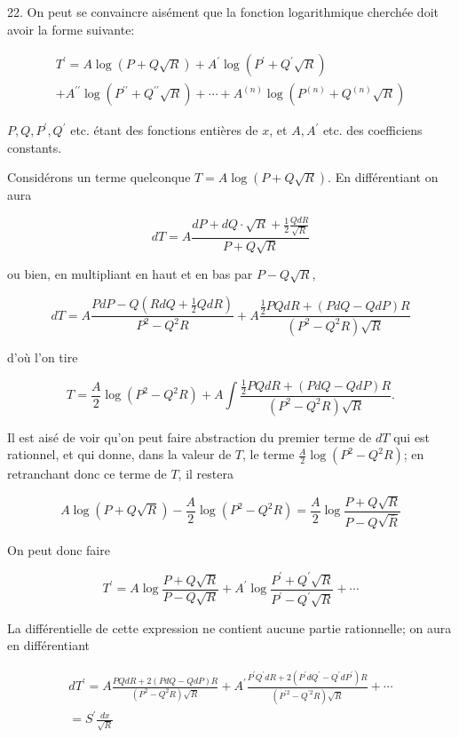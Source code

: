 \documentclass{article}
\begin{document}
22. On peut se convaincre aisément que la fonction logarithmique cherchée doit avoir la forme suivante:

\[
\begin{gathered}
T^{\prime}=A \log (P+Q \sqrt{R})+A^{\prime} \log \left(P^{\prime}+Q^{\prime} \sqrt{R}\right) \\
+A^{\prime \prime} \log \left(P^{\prime \prime}+Q^{\prime \prime} \sqrt{R}\right)+\cdots+A^{(n)} \log \left(P^{(n)}+Q^{(n)} \sqrt{R}\right)
\end{gathered}
\]

\(P, Q, P^{\prime}, Q^{\prime}\) etc. étant des fonctions entières de \(x\), et \(A, A^{\prime}\) etc. des coefficiens constants.

Considérons un terme quelconque \(T=A \log (P+Q \sqrt{R})\). En différentiant on aura

\[
d T=A \frac{d P+d Q \cdot \sqrt{R}+\frac{1}{2} \frac{Q d R}{\sqrt{R}}}{P+Q \sqrt{R}}
\]

ou bien, en multipliant en haut et en bas par \(P-Q \sqrt{R}\),

\[
d T=A \frac{P d P-Q\left(R d Q+\frac{1}{2} Q d R\right)}{P^{2}-Q^{2} R}+A \frac{\frac{1}{2} P Q d R+(P d Q-Q d P) R}{\left(P^{2}-Q^{2} R\right) \sqrt{R}}
\]

d'où l'on tire

\[
T=\frac{A}{2} \log \left(P^{2}-Q^{2} R\right)+A \int \frac{\frac{1}{2} P Q d R+(P d Q-Q d P) R}{\left(P^{2}-Q^{2} R\right) \sqrt{R}} .
\]

Il est aisé de voir qu'on peut faire abstraction du premier terme de \(d T\) qui est rationnel, et qui donne, dans la valeur de \(T\), le terme \(\frac{A}{2} \log \left(P^{2}-Q^{2} R\right)\); en retranchant donc ce terme de \(T\), il restera

\[
A \log (P+Q \sqrt{R})-\frac{A}{2} \log \left(P^{2}-Q^{2} R\right)=\frac{A}{2} \log \frac{P+Q \sqrt{R}}{P-Q \sqrt{\bar{R}}}
\]

On peut donc faire

\[
T^{\prime}=A \log \frac{P+Q \sqrt{R}}{P-Q \sqrt{R}}+A^{\prime} \log \frac{P^{\prime}+Q^{\prime} \sqrt{R}}{P^{\prime}-Q^{\prime} \sqrt{R}}+\cdots
\]

La différentielle de cette expression ne contient aucune partie rationnelle; on aura en différentiant

\[
\begin{gathered}
d T^{\prime}=A \frac{P Q d R+2(P d Q-Q d P) R}{\left(P^{2}-Q^{2} R\right) \sqrt{R}}+A^{\prime} \frac{P^{\prime} Q^{\prime} d R+2\left(P^{\prime} d Q^{\prime}-Q^{\prime} d P^{\prime}\right) R}{\left(P^{\prime 2}-Q^{\prime 2} R\right) \sqrt{R}}+\cdots \\
=S^{\prime} \frac{d x}{\sqrt{R}}
\end{gathered}
\]
\end{document}
